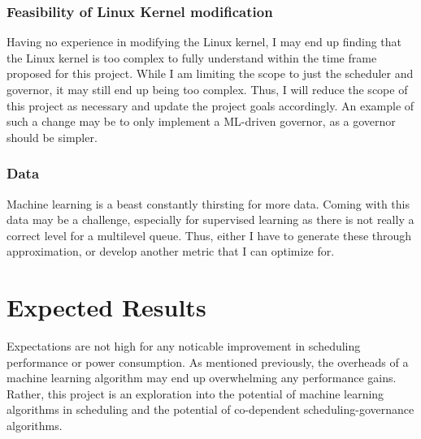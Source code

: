 \documentclass[12pt]{article}
\def\ind{\hspace*{0.3in}}
\begin{document}
\subsubsection*{Feasibility of Linux Kernel modification}
\ind Having no experience in modifying the Linux kernel, I may end up finding that the Linux kernel is too complex to fully understand within the time frame proposed for this project. While I am limiting the scope to just the scheduler and governor, it may still end up being too complex. Thus, I will reduce the scope of this project as necessary and update the project goals accordingly. An example of such a change may be to only implement a ML-driven governor, as a governor should be simpler.
\subsubsection*{Data}
Machine learning is a beast constantly thirsting for more data. Coming with this data may be a challenge, especially for supervised learning as there is not really a correct level for a multilevel queue. Thus, either I have to generate these through approximation, or develop another metric that I can optimize for.

\section*{Expected Results}

Expectations are not high for any noticable improvement in scheduling performance or power consumption. As mentioned previously, the overheads of a machine learning algorithm may end up overwhelming any performance gains. Rather, this project is an exploration into the potential of machine learning algorithms in scheduling and the potential of co-dependent scheduling-governance algorithms.

{}

\end{document}

